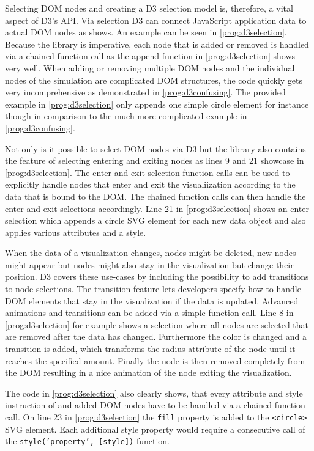 Selecting DOM nodes and creating a D3 selection model is, therefore, a vital aspect of D3's API. Via selection D3 can connect JavaScript application data to actual DOM nodes as \cite[/d3-selection]{D3Github} shows. An example can be seen in \ref{prog:d3selection}. Because the library is imperative, each node that is added or removed is handled via a chained function call as the append function in \ref{prog:d3selection} shows very well. When adding or removing multiple DOM nodes and the individual nodes of the simulation are complicated DOM structures, the code quickly gets very incomprehensive as demonstrated in \ref{prog:d3confusing}. The provided example in \ref{prog:d3selection} only appends one simple circle element for instance though in comparison to the much more complicated example in \ref{prog:d3confusing}. 

Not only is it possible to select DOM nodes via D3 but the library also contains the feature of selecting entering and exiting nodes as lines 9 and 21 showcase in \ref{prog:d3selection}. The enter and exit selection function calls can be used to explicitly handle nodes that enter and exit the visualiization according to the data that is bound to the DOM. The chained function calls can then handle the enter and exit selections accordingly. Line 21 in \ref{prog:d3selection} shows an enter selection which appends a circle SVG element for each new data object and also applies various attributes and a style.

When the data of a visualization changes, nodes might be deleted, new nodes might appear but nodes might also stay in the visualization but change their position. D3 covers these use-cases by including the possibility to add transitions to node selections. The transition feature lets developers specify how to handle DOM elements that stay in the visualization if the data is updated. Advanced animations and transitions can be added via a simple function call. Line 8 in \ref{prog:d3selection} for example shows a selection where all nodes are selected that are removed after the data has changed. Furthermore the color is changed and a transition is added, which transforms the radius attribute of the node until it reaches the specified amount. Finally the node is then removed completely from the DOM resulting in a nice animation of the node exiting the visualization.

The code in \ref{prog:d3selection} also clearly shows, that every attribute and style instruction of and added DOM nodes have to be handled via a chained function call. On line 23 in \ref{prog:d3selection} the \texttt{fill} property is added to the \texttt{<circle>} SVG element. Each additional style property would require a consecutive call of the \texttt{style('property', [style])} function.

